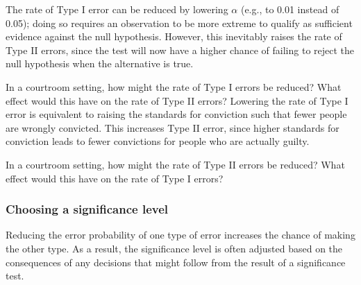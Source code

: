 The rate of Type I error can be reduced by lowering $\alpha$ (e.g., to 0.01 instead of 0.05); doing so requires an observation to be more extreme to qualify as sufficient evidence against the null hypothesis. However, this inevitably raises the rate of Type II errors, since the test will now have a higher chance of failing to reject the null hypothesis when the alternative is true.

\begin{examplewrap}
\begin{nexample}{In a courtroom setting, how might the rate of Type I errors be reduced? What effect would this have on the rate of Type II errors?}	
Lowering the rate of Type I error is equivalent to raising the standards for conviction such that fewer people are wrongly convicted. This increases Type II error, since higher standards for conviction leads to fewer convictions for people who are actually guilty.
\end{nexample}
\end{examplewrap}

\begin{exercisewrap}
\begin{nexercise}\label{howToReduceType2ErrorsInUSCourts}%
In a courtroom setting, how might the rate of Type II errors be reduced? What effect would this have on the rate of Type I errors?\footnotemark{}
\end{nexercise}
\end{exercisewrap}



\subsubsection{Choosing a significance level}


Reducing the error probability of one type of error increases the chance of making the other type. As a result, the significance level is often adjusted based on the consequences of any decisions that might follow from the result of a significance test.


